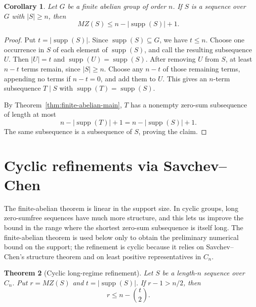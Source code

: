 \documentclass[12pt,reqno]{amsart}
\newtheorem{theorem}{Theorem}[section]
\newtheorem{corollary}[theorem]{Corollary}
\theoremstyle{definition}
\theoremstyle{remark}
\DeclareMathOperator{\supp}{supp}
\begin{document}
\begin{corollary}\label{cor:length-at-least}
Let $G$ be a finite abelian group of order $n$.  If $S$ is a sequence over $G$ with $|S|\ge n$, then
\[
  MZ(S)\le n-|\supp(S)|+1.
\]
\end{corollary}

\begin{proof}
Put $t=|\supp(S)|$.  Since $\supp(S)\subseteq G$, we have $t\le n$.  Choose one occurrence in $S$ of each element of $\supp(S)$, and call the resulting subsequence $U$.  Then $|U|=t$ and $\supp(U)=\supp(S)$.  After removing $U$ from $S$, at least $n-t$ terms remain, since $|S|\ge n$.  Choose any $n-t$ of those remaining terms, appending no terms if $n-t=0$, and add them to $U$.  This gives an $n$-term subsequence $T\mid S$ with $\supp(T)=\supp(S)$.

By Theorem~\ref{thm:finite-abelian-main}, $T$ has a nonempty zero-sum subsequence of length at most
\[
  n-|\supp(T)|+1=n-|\supp(S)|+1.
\]
The same subsequence is a subsequence of $S$, proving the claim.
\end{proof}

\section{Cyclic refinements via Savchev--Chen}

The finite-abelian theorem is linear in the support size.  In cyclic groups, long zero-sumfree sequences have much more structure, and this lets us improve the bound in the range where the shortest zero-sum subsequence is itself long.  The finite-abelian theorem is used below only to obtain the preliminary numerical bound on the support; the refinement is cyclic because it relies on Savchev--Chen's structure theorem and on least positive representatives in $C_n$.

\begin{theorem}[Cyclic long-regime refinement]\label{thm:savchev-chen-refinement}
Let $S$ be a length-$n$ sequence over $C_n$.  Put $r=MZ(S)$ and $t=|\supp(S)|$.  If $r-1>n/2$, then
\[
  r\le n-\binom{t}{2}.
\]
\end{theorem}
\end{document}
